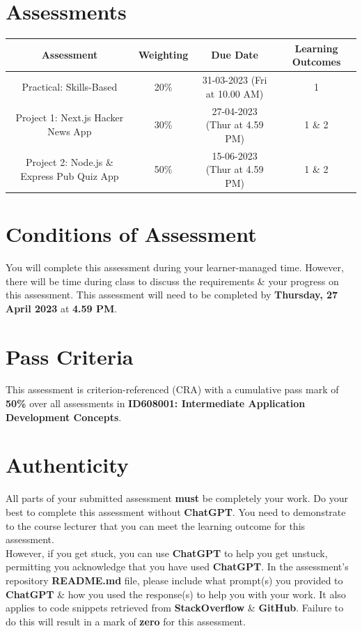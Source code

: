 \documentclass{article}
\begin{document}
\section*{Assessments}
\renewcommand{\arraystretch}{1.5}
\begin{tabular}{|c|c|c|c|}
	\hline
	\textbf{Assessment}                                 & \textbf{Weighting} & \textbf{Due Date}            & \textbf{Learning Outcomes} \\ \hline
	\small Practical: Skills-Based & \small 20\%        & \small 31-03-2023 (Fri at 10.00 AM)   & \small 1                   \\ \hline
	\small Project 1: Next.js Hacker News App             & \small 30\%        & \small 27-04-2023 (Thur at 4.59 PM)  & \small 1 \& 2                   \\ \hline
	\small Project 2: Node.js \& Express Pub Quiz App                       & \small 50\%        & \small 15-06-2023 (Thur at 4.59 PM)  & \small 1 \& 2                   \\ \hline
\end{tabular}

\section*{Conditions of Assessment}
You will complete this assessment during your learner-managed time. However, there will be time during class to discuss the requirements \& your progress on this assessment. This assessment will need to be completed by \textbf{Thursday, 27 April 2023} at \textbf{4.59 PM}.

\section*{Pass Criteria}
This assessment is criterion-referenced (CRA) with a cumulative pass mark of \textbf{50\%} over all assessments in \textbf{ID608001: Intermediate Application Development Concepts}.

\section*{Authenticity}
All parts of your submitted assessment \textbf{must} be completely your work. Do your best to complete this assessment without \textbf{ChatGPT}. You need to demonstrate to the course lecturer that you can meet the learning outcome for this assessment. \\
 
 However, if you get stuck, you can use \textbf{ChatGPT} to help you get unstuck, permitting you acknowledge that you have used \textbf{ChatGPT}. In the assessment's repository \textbf{README.md} file, please include what prompt(s) you provided to \textbf{ChatGPT} \& how you used the response(s) to help you with your work. It also applies to code snippets retrieved from \textbf{StackOverflow} \& \textbf{GitHub}. Failure to do this will result in a mark of \textbf{zero} for this assessment.
\end{document}

